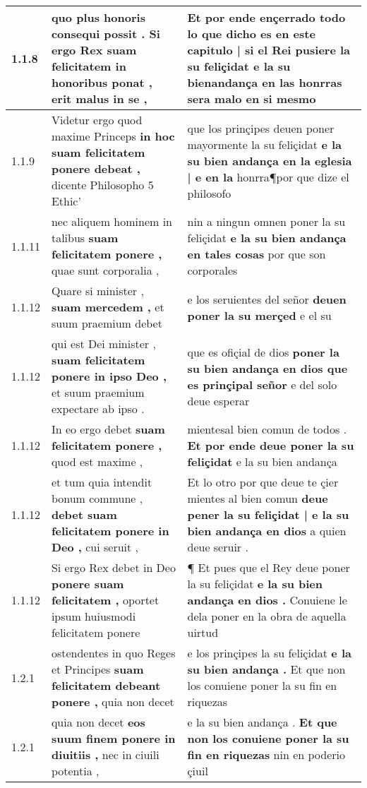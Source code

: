 \begin{tabular}{|p{1cm}|p{6.5cm}|p{6.5cm}|}
1.1.8 & quo plus honoris consequi possit . \textbf{ Si ergo Rex suam felicitatem in honoribus ponat , } erit malus in se , & Et por ende ençerrado todo lo \textbf{ que dicho es en este capitulo | si el Rei pusiere la su feliçidat } e la su bienandança en las honrras sera malo en si mesmo \\\hline
1.1.9 & Videtur ergo quod maxime Princeps \textbf{ in hoc suam felicitatem ponere debeat , } dicente Philosopho 5 Ethic’ & que los prinçipes deuen poner mayormente la su feliçidat \textbf{ e la su bien andança en la eglesia | e en la } honrra¶por que dize el philosofo \\\hline
1.1.11 & nec aliquem hominem in talibus \textbf{ suam felicitatem ponere , } quae sunt corporalia , & nin a ningun omnen poner la su feliçidat \textbf{ e la su bien andança en tales cosas } por que son corporales \\\hline
1.1.12 & Quare si minister , \textbf{ suam mercedem , } et suum praemium debet & e los seruientes del señor \textbf{ deuen poner la su merçed } e el su \\\hline
1.1.12 & qui est Dei minister , \textbf{ suam felicitatem ponere in ipso Deo , } et suum praemium expectare ab ipso . & que es ofiçial de dios \textbf{ poner la su bien andança en dios que es prinçipal señor } e del solo deue esperar \\\hline
1.1.12 & In eo ergo debet \textbf{ suam felicitatem ponere , } quod est maxime , & mientesal bien comun de todos . \textbf{ Et por ende deue poner la su feliçidat } e la su bien andança \\\hline
1.1.12 & et tum quia intendit bonum commune , \textbf{ debet suam felicitatem ponere in Deo , } cui seruit , & Et lo otro por que deue te çier mientes al bien comun \textbf{ deue pener la su feliçidat | e la su bien andança en dios } a quien deue seruir . \\\hline
1.1.12 & Si ergo Rex debet in Deo \textbf{ ponere suam felicitatem , } oportet ipsum huiusmodi felicitatem ponere & ¶ Et pues que el Rey deue poner la su feliçidat \textbf{ e la su bien andança en dios . } Conuiene le dela poner en la obra de aquella uirtud \\\hline
1.2.1 & ostendentes in quo Reges et Principes \textbf{ suam felicitatem debeant ponere , } quia non decet & e los prinçipes la su feliçidat \textbf{ e la su bien andança . } Et que non los conuiene poner la su fin en riquezas \\\hline
1.2.1 & quia non decet \textbf{ eos suum finem ponere in diuitiis , } nec in ciuili potentia , & e la su bien andança . \textbf{ Et que non los conuiene poner la su fin en riquezas } nin en poderio çiuil \\\hline

\end{tabular}
